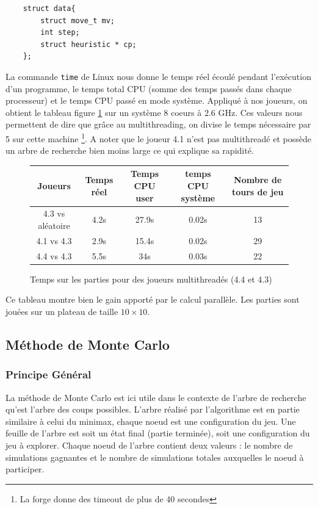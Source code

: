 \documentclass[a4paper,11pt]{article}
\begin{document}
\begin{lstlisting}
    struct data{
        struct move_t mv;
        int step;
        struct heuristic * cp;
    };
\end{lstlisting}

La commande \verb+time+ de Linux nous donne le temps réel écoulé pendant l'exécution d'un programme, le temps total CPU (somme des temps passés dans chaque processeur) et le temps CPU passé en mode système. Appliqué à nos joueurs, on obtient le tableau figure \ref{tab2} sur un système 8 coeurs à 2.6 GHz. Ces valeurs nous permettent de dire que grâce au multithreading, on divise le temps nécessaire par 5 sur cette machine \footnote{La forge donne des timeout de plus de 40 secondes}. A noter que le joueur 4.1 n'est pas multithreadé et possède un arbre de recherche bien moins large ce qui explique sa rapidité.
\begin{figure}[h]
    \centering
    \caption{Temps sur les parties pour des joueurs multithreadés (4.4 et 4.3)}
    \label{tab2}
    \begin{tabular}{|c|c|c|c|c|}
    \hline
        Joueurs & Temps réel & Temps CPU user & temps CPU système & Nombre de tours de jeu\\
        \hline
         4.3 vs aléatoire & 4.2s & 27.9s & 0.02s & 13\\
        \hline
        4.1 vs 4.3 & 2.9s & 15.4s & 0.02s & 29 \\
        \hline
        4.4 vs 4.3 & 5.5s & 34s & 0.03s & 22\\
        \hline
    \end{tabular}
\end{figure}

Ce tableau montre bien le gain apporté par le calcul parallèle. Les parties sont jouées sur un plateau de taille $10\times 10$.

\subsection{Méthode de Monte Carlo}

\subsubsection{Principe Général}

La méthode de Monte Carlo est ici utile dans le contexte de l'arbre de recherche qu'est l'arbre des coups possibles. L'arbre réalisé par l'algorithme est en partie similaire à celui du minimax, chaque noeud est une configuration du jeu. Une feuille de l'arbre est soit un état final (partie terminée), soit une configuration du jeu à explorer. Chaque noeud de l'arbre contient deux valeurs : le nombre de simulations gagnantes et le nombre de simulations totales auxquelles le noeud à participer. \\
\end{document}
